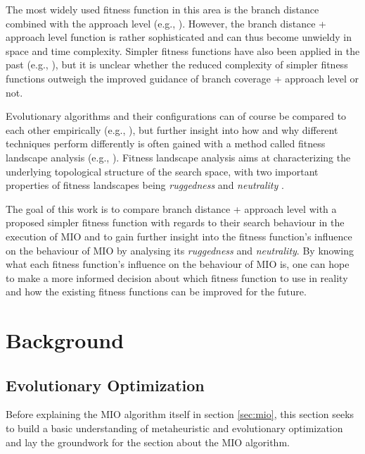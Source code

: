 \documentclass[
  a4paper,  %
  twoside,  %
  bibliography=totoc,
  headsepline,
  cleardoublepage=empty,
  parskip=half,
  draft=false
]{scrbook}
\begin{document}
The most widely used fitness function in this area is the branch distance \cite{korel1990automated} combined with the approach level \cite{wegener2001evolutionary, wegener2002automatic} (e.g., \cite{panichella2015reformulating, panichella2017automated, fraser2012whole}).
However, the branch distance + approach level function is rather sophisticated and can thus become unwieldy in space and time complexity.
Simpler fitness functions have also been applied in the past (e.g., \cite{sell2019empirical}), but it is unclear whether the reduced complexity of simpler fitness functions outweigh the improved guidance of branch coverage + approach level or not.

Evolutionary algorithms and their configurations can of course be compared to each other empirically (e.g., \cite{sell2019empirical, fraser2014large, panichella2018large}), but further insight into how and why different techniques perform differently is often gained with a method called fitness landscape analysis (e.g., \cite{albunian2020causes, vogel2019does, aleti2017analysing}).
Fitness landscape analysis aims at characterizing the underlying topological structure of the search space, with two important properties of fitness landscapes being \emph{ruggedness} and \emph{neutrality} \cite{pitzer2012comprehensive}.

The goal of this work is to compare branch distance + approach level with a proposed simpler fitness function with regards to their search behaviour in the execution of MIO and to gain further insight into the fitness function's influence on the behaviour of MIO by analysing its \emph{ruggedness} and \emph{neutrality}. By knowing what each fitness function's influence on the behaviour of MIO is, one can hope to make a more informed decision about which fitness function to use in reality and how the existing fitness functions can be improved for the future.


\chapter{Background}

\section{Evolutionary Optimization}

Before explaining the MIO algorithm itself in section \ref{sec:mio}, this section seeks to build a basic understanding of metaheuristic and evolutionary optimization and lay the groundwork for the section about the MIO algorithm.
\end{document}
